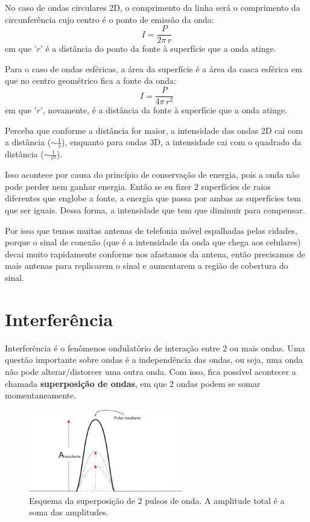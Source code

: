 \documentclass[12pt]{extarticle}
\newcommand{\<}{\langle}
\renewcommand{\>}{\rangle}
\theoremstyle{definition}
\begin{document}
No caso de ondas circulares 2D, o comprimento da linha será o comprimento da circunferência cujo centro é o ponto de emissão da onda:
\begin{equation}
    I = \frac{P}{2\pi\,r}
\end{equation}
\noindent em que '$r$' é a distância do ponto da fonte à superfície que a onda atinge.

Para o caso de ondas esféricas, a área da superfície é a área da casca esférica em que no centro geométrico fica a fonte da onda:
\begin{equation}
    I = \frac{P}{4\pi\,r^2}
\end{equation}
\noindent em que '$r$', novamente, é a distância da fonte à superfície que a onda atinge.

Perceba que conforme a distância for maior, a intensidade das ondas 2D cai com a distância ($\sim\frac{1}{r}$), enquanto para ondas 3D, a intensidade cai com o quadrado da distância ($\sim\frac{1}{r^2}$). 

Isso acontece por causa do princípio de conservação de energia, pois a onda não pode perder nem ganhar energia. Então se eu fizer 2 superfícies de raios diferentes que englobe a fonte, a energia que passa por ambas as superfícies tem que ser iguais. Dessa forma, a intensidade que tem que diminuir para compensar.

Por isso que temos muitas antenas de telefonia móvel espalhadas pelas cidades, porque o sinal de conexão (que é a intensidade da onda que chega aos celulares) decai muito rapidamente conforme nos afastamos da antena, então precisamos de mais antenas para replicarem o sinal e aumentarem a região de cobertura do sinal.

\section{Interferência}
Interferência é o fenômenos ondulatório de interação entre 2 ou mais ondas. Uma questão importante sobre ondas é a independência das ondas, ou seja, uma onda não pode alterar/distorcer uma outra onda. Com isso, fica possível acontecer a chamada \textbf{superposição de ondas}, em que 2 ondas podem se somar momentaneamente.

\begin{figure}[H]
    \centering
    \includegraphics[width=0.6\textwidth]{superposicao.png}
    \caption{Esquema da superposição de 2 pulsos de onda. A amplitude total é a soma das amplitudes.}
    \label{fig:superposicao}
\end{figure}
\end{document}
